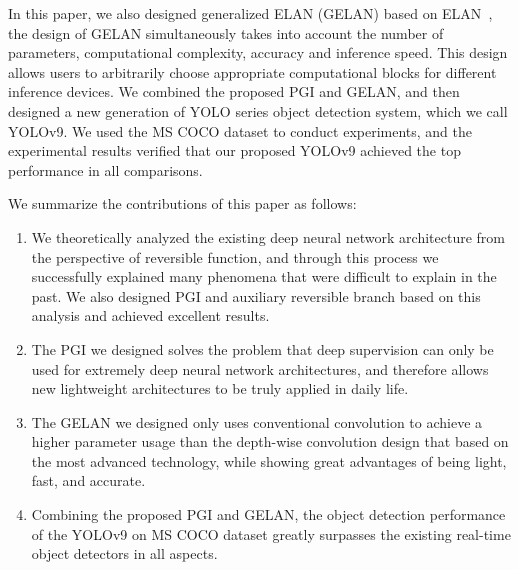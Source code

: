 \documentclass[10pt,twocolumn,letterpaper]{article}
\begin{document}
	In this paper, we also designed generalized ELAN (GELAN) based on ELAN~\cite{wang2023designing}, the design of GELAN simultaneously takes into account the number of parameters, computational complexity, accuracy and inference speed.  This design allows users to arbitrarily choose appropriate computational blocks for different inference devices.  We combined the proposed PGI and GELAN, and then designed a new generation of YOLO series object detection system, which we call YOLOv9.  We used the MS COCO dataset to conduct experiments, and the experimental results verified that our proposed YOLOv9 achieved the top performance in all comparisons.
	
	We summarize the contributions of this paper as follows:
	\begin{enumerate}
		
		\item We theoretically analyzed the existing deep neural network architecture from the perspective of reversible function, and through this process we successfully explained many phenomena that were difficult to explain in the past.  We also designed PGI and auxiliary reversible branch based on this analysis and achieved excellent results.
		
		\vspace{-4pt}
		
		\item The PGI we designed solves the problem that deep supervision can only be used for extremely deep neural network architectures, and therefore allows new lightweight architectures to be truly applied in daily life.
		
		\vspace{-4pt}
		
		\item The GELAN we designed only uses conventional convolution to achieve a higher parameter usage than the depth-wise convolution design that based on the most advanced technology, while showing great advantages of being light, fast, and accurate.
		
		\vspace{-4pt}
		
		\item Combining the proposed PGI and GELAN, the object detection performance of the YOLOv9 on MS COCO dataset greatly surpasses the existing real-time object detectors in all aspects.
	\end{enumerate}	

	\newpage
	
\end{document}
